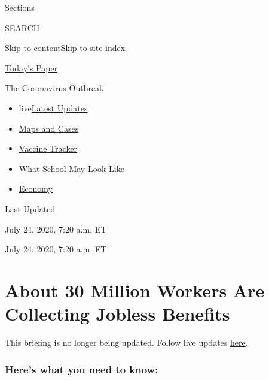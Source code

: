 Sections

SEARCH

\protect\hyperlink{site-content}{Skip to
content}\protect\hyperlink{site-index}{Skip to site index}

\href{https://myaccount.nytimes.com/auth/login?response_type=cookie\&client_id=vi}{}

\href{https://www.nytimes.com/section/todayspaper}{Today's Paper}

\href{https://www.nytimes.com/news-event/coronavirus}{The Coronavirus
Outbreak}

\begin{itemize}
\tightlist
\item
  live\href{https://www.nytimes.com/2020/08/01/world/coronavirus-covid-19.html}{Latest
  Updates}
\item
  \href{https://www.nytimes.com/interactive/2020/us/coronavirus-us-cases.html}{Maps
  and Cases}
\item
  \href{https://www.nytimes.com/interactive/2020/science/coronavirus-vaccine-tracker.html}{Vaccine
  Tracker}
\item
  \href{https://www.nytimes.com/interactive/2020/07/29/us/schools-reopening-coronavirus.html}{What
  School May Look Like}
\item
  \href{https://www.nytimes.com/live/2020/07/31/business/stock-market-today-coronavirus}{Economy}
\end{itemize}

Last Updated

July 24, 2020, 7:20 a.m. ET

July 24, 2020, 7:20 a.m. ET

\hypertarget{about-30-million-workers-are-collecting-jobless-benefits}{%
\section{About 30 Million Workers Are Collecting Jobless
Benefits}\label{about-30-million-workers-are-collecting-jobless-benefits}}

This briefing is no longer being updated. Follow live updates
\href{https://www.nytimes.com/live/2020/07/24/business/stock-market-updates-coronavirus}{here}.

\hypertarget{heres-what-you-need-to-know}{%
\subsubsection{Here's what you need to
know:}\label{heres-what-you-need-to-know}}

